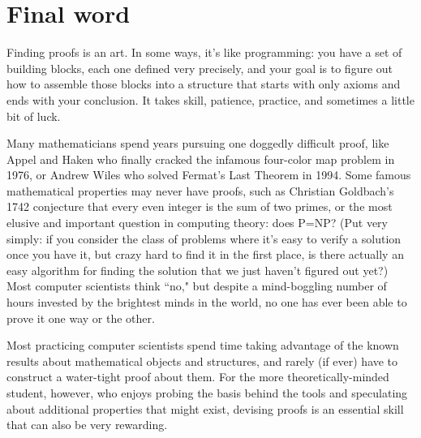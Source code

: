 \section{Final word}

Finding proofs is an art. In some ways, it's like programming: you have a
set of building blocks, each one defined very precisely, and your goal is
to figure out how to assemble those blocks into a structure that starts
with only axioms and ends with your conclusion. It takes skill, patience,
practice, and sometimes a little bit of luck. 

Many mathematicians spend years pursuing one doggedly difficult proof, like
Appel and Haken who finally cracked the infamous four-color map problem in
1976, or Andrew Wiles who solved Fermat's Last Theorem in 1994. Some famous
mathematical properties may never have proofs, such as Christian Goldbach's
1742 conjecture that every even integer is the sum of two primes, or the most
elusive and important question in computing theory: does P=NP? (Put very
simply: if you consider the class of problems where it's easy to verify a
solution once you have it, but crazy hard to find it in the first place, is
there actually an easy algorithm for finding the solution that we just haven't
figured out yet?) Most computer scientists think ``no," but despite a
mind-boggling number of hours invested by the brightest minds in the world, no
one has ever been able to prove it one way or the other.

Most practicing computer scientists spend time taking advantage of the
known results about mathematical objects and structures, and rarely (if ever)
have to construct a water-tight proof about them. For the more
theoretically-minded student, however, who enjoys probing the basis behind
the tools and speculating about additional properties that might exist,
devising proofs is an essential skill that can also be very rewarding.
